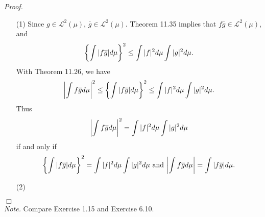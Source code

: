 \documentclass{article}
\begin{document}
\emph{Proof.}
\begin{enumerate}
\item[(1)]
  Since $g \in \mathscr{L}^2(\mu)$, $\overline{g} \in \mathscr{L}^2(\mu)$.
  Theorem 11.35 implies that
  $f\overline{g} \in \mathscr{L}^2(\mu)$, and
  \[
    \left\{ \int \abs{ f\overline{g} } d\mu \right\}^2
    \leq \int |f|^2 d\mu \int |g|^2 d\mu.
  \]
  With Theorem 11.26, we have
  \[
    \abs{ \int f\overline{g} d\mu }^2
    \leq \left\{ \int \abs{ f\overline{g} } d\mu \right\}^2
    \leq \int |f|^2 d\mu \int |g|^2 d\mu.
  \]
  Thus
  \[
    \abs{ \int f\overline{g} d\mu }^2 = \int |f|^2 d\mu \int |g|^2 d\mu
  \]
  if and only if
  \[
    \left\{ \int \abs{ f\overline{g} } d\mu \right\}^2 = \int |f|^2 d\mu \int |g|^2 d\mu
    \text{ and }
    \abs{ \int f\overline{g} d\mu } = \int \abs{ f\overline{g} } d\mu.
  \]

\item[(2)]

\end{enumerate}
$\Box$ \\



\emph{Note.}
Compare Exercise 1.15 and Exercise 6.10. \\\\



\end{document}
